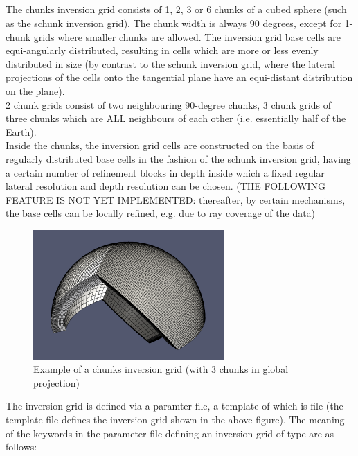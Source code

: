 \subsection{} \label{basic_steps,sec:invgrid,sub:chunks}
%
The chunks inversion grid consists of 1, 2, 3 or 6 chunks of a cubed sphere (such as the 
schunk inversion grid). The chunk width is always 90 degrees, except for 1-chunk grids
where smaller chunks are allowed. The inversion grid base cells are equi-angularly distributed,
resulting in cells which are more or less evenly distributed in size (by contrast to the 
schunk inversion grid, where the lateral projections of the cells onto the tangential plane
have an equi-distant distribution on the plane).\\ 
2 chunk grids consist of two neighbouring 90-degree chunks, 3 chunk grids of three chunks 
which are ALL neighbours of each other (i.e. essentially half of the Earth).\\
Inside the chunks, the inversion grid cells are constructed on the basis of regularly distributed
base cells in the fashion of the schunk inversion grid, having a certain number of refinement
blocks in depth inside which a fixed regular lateral resolution and depth resolution can be chosen.
(THE FOLLOWING FEATURE IS NOT YET IMPLEMENTED: thereafter, by certain mechanisms, the base cells
can be locally refined, e.g. due to ray coverage of the data)

\begin{figure}[ht]
  \centering
  \includegraphics[width=0.65\textwidth]{images/chunksInversionGrid_manual.png}
  \caption{Example of a chunks inversion grid (with 3 chunks in global projection)}
  \label{basic_steps,sec:invgrid,sub:chunks,fig:grid}
\end{figure}

The inversion grid is defined via a paramter file, a template of which is file 
 (the template file defines the inversion grid
shown in the above figure).
The meaning of the keywords in the parameter file defining an inversion grid of type 
are as follows:

